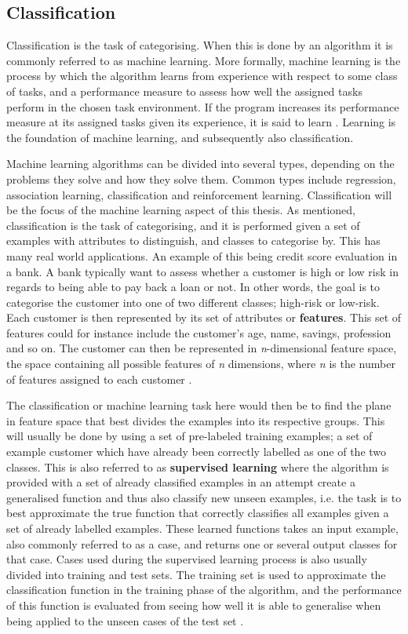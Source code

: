 \subsection{Classification}
Classification is the task of categorising. When this is done by an algorithm it is commonly referred to as machine learning. More formally, machine learning is the process by which the algorithm learns from experience with respect to some class of tasks, and a performance measure to assess how well the assigned tasks perform in the chosen task environment. If the program increases its performance measure at its assigned tasks given its experience, it is said to learn \cite{mitchell1997machine}. Learning is the foundation of machine learning, and subsequently also classification.

Machine learning algorithms can be divided into several types, depending on the problems they solve and how they solve them. Common types include regression, association learning, classification and reinforcement learning. Classification will be the focus of the machine learning aspect of this thesis. As mentioned, classification is the task of categorising, and it is performed given a set of examples with attributes to distinguish, and classes to categorise by. This has many real world applications. An example of this being credit score evaluation in a bank. A bank typically want to assess whether a customer is high or low risk in regards to being able to pay back a loan or not. In other words, the goal is to categorise the customer into one of two different classes; high-risk or low-risk. Each customer is then represented by its set of attributes or \textbf{features}. This set of features could for instance include the customer's age, name, savings, profession and so on. The customer can then be represented in \textit{n}-dimensional feature space, the space containing all possible features of \textit{n} dimensions, where \textit{n} is the number of features assigned to each customer \cite{alpaydin2009introduction}. 

The classification or machine learning task here would then be to find the plane in feature space that best divides the examples into its respective groups. This will usually be done by using a set of pre-labeled training examples; a set of example customer which have already been correctly labelled as one of the two classes. This is also referred to as \textbf{supervised learning} where the algorithm is provided with a set of already classified examples in an attempt create a generalised function and thus also classify new unseen examples, i.e. the task is to best approximate the true function that correctly classifies all examples given a set of already labelled examples. These learned functions takes an input example, also commonly referred to as a case, and returns one or several output classes for that case. Cases used during the supervised learning process is also usually divided into training and test sets. The training set is used to approximate the classification function in the training phase of the algorithm, and the performance of this function is evaluated from seeing how well it is able to generalise when being applied to the unseen cases of the test set \cite{mitchell1997machine}.

